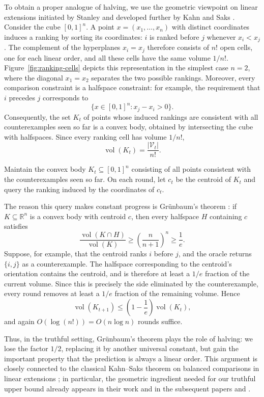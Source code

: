 \documentclass[11pt]{article}
\theoremstyle{definition}
\theoremstyle{remark}
\begin{document}
To obtain a proper analogue of halving, we use the geometric viewpoint on
linear extensions initiated by Stanley \cite{Stanley1981} and developed
further by Kahn and Saks \cite{KahnSaks1984}. Consider the cube
$[0,1]^n$. A point $x=(x_1,\ldots,x_n)$ with distinct coordinates induces
a ranking by sorting its coordinates: $i$ is ranked before $j$ whenever
$x_i<x_j$. The complement of the hyperplanes $x_i=x_j$ therefore consists of $n!$ open cells, one for each linear order, and all these cells have the same volume $1/n!$.
Figure~\ref{fig:ranking-cells} depicts this representation in the simplest
case $n=2$, where the diagonal $x_1=x_2$ separates the two possible
rankings. Moreover, every comparison constraint is
a halfspace constraint: for example, the requirement that $i$ precedes $j$
corresponds to
\[
    \bigl\{x\in[0,1]^n : x_j-x_i>0\bigr\}.
\]
Consequently, the set $K_t$ of points whose induced rankings are consistent
with all counterexamples seen so far is a convex body, obtained by
intersecting the cube with halfspaces. Since every ranking cell has volume
$1/n!$,
\[
    \operatorname{vol}(K_t)=\frac{|\mathcal V_t|}{n!}.
\]
\begin{algorithmbox}
Maintain the convex body $K_t\subseteq[0,1]^n$ consisting of all points
consistent with the counterexamples seen so far. On each round, let $c_t$ be
the centroid of $K_t$ and query the ranking induced by the coordinates of
$c_t$.
\end{algorithmbox}
The reason this query makes constant progress is
Gr\"unbaum's theorem \cite{Grunbaum1960}: if $K\subseteq\mathbb R^n$ is a
convex body with centroid $c$, then every halfspace $H$ containing $c$
satisfies
\[
    \frac{\operatorname{vol}(K\cap H)}
         {\operatorname{vol}(K)}
    \geq
    \left(\frac{n}{n+1}\right)^n
    \geq \frac1e.
\]
Suppose, for example, that the centroid ranks $i$ before $j$, and the oracle
returns $\{i,j\}$ as a counterexample. The halfspace corresponding to the
centroid's orientation contains the centroid, and is therefore at least a
$1/e$ fraction of the current volume. Since this is precisely the side
eliminated by the counterexample, every round removes at least a $1/e$
fraction of the remaining volume. Hence
\[
    \operatorname{vol}(K_{t+1})
    \leq
    \left(1-\frac1e\right)\operatorname{vol}(K_t),
\]
and again $O(\log(n!))=O(n\log n)$ rounds suffice.

Thus, in the truthful setting, Gr\"unbaum's theorem plays the role of
halving: we lose the factor $1/2$, replacing it by another universal
constant, but gain the important property that the prediction is always a
linear order. This argument is closely connected to the classical
Kahn--Saks theorem on balanced comparisons in linear extensions
\cite{KahnSaks1984}; in particular, the geometric ingredient needed for our
truthful upper bound already appears in their work and in the subsequent papers \cite{KahnLinial1991} and \cite{KarzanovKhachiyan1991}.
\end{document}
